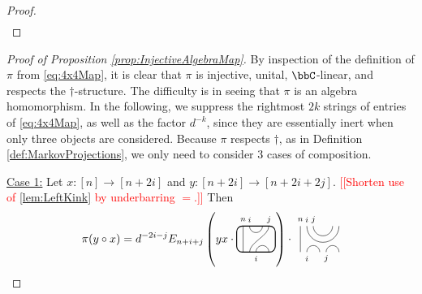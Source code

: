 \documentclass[11pt]{article}
\theoremstyle{plain}
\theoremstyle{definition}
\newcommand{\nn}[1]{\textcolor{red}{[[#1]]}}
\newcommand{\TLPlusPIso}[3]{
 \TLTStart
 \TLTThrough{#1}
 \TLTSnakeR{#2}{#3}
 \TLTEnd
}
\newcommand{\TLCapJoin}[5]{
 \TLTStart
 \TLTThrough{#1}
 \TLTCapJoin{#2}{#3}{#4}{#5}
 \TLTEnd
}
\newcommand{\TLTCalcLabelOffset}[3][0cm]{
 \settowidth{#2}{\scriptsize{$#3$}}
 \setlength{#2}{.5#2}
 \setlength{#2}{\maxof{#2}{#1}}
}
\newcommand{\TLTEnd}{
 \draw[thick, rounded corners = 5pt] (0,0) rectangle ($ (TLTlead) + (0,.8) $);
 \end{tikzpicture}
}
\newcommand{\TLTStart}{
 \begin{tikzpicture}[baseline=.3cm]
 \coordinate (TLTlead) at (.2,0); %
 \let\TLTlabelwidth\relax
 \newlength{\TLTlabelwidth}
}
\newcommand{\TLTThrough}[1]{
 \TLTCalcLabelOffset[.2cm]{\TLTlabelwidth}{#1}
 \coordinate (TLTlead) at ($ (TLTlead) + ({\TLTlabelwidth},0) $);
 \begin{scope}[shift=(TLTlead)]
  \draw (0,0) -- (0,.8);
  \node at (0,1) {\scriptsize{$#1$}};
 \end{scope}
  \coordinate (TLTlead) at ($ (TLTlead) + ({\TLTlabelwidth},0) $);
}
\newcommand{\TLTSnakeR}[2]{
 \let\TLTscwidth\relax
 \newlength{\TLTscwidth}
 \let\TLTsswidth\relax
 \newlength{\TLTsswidth}
 \TLTCalcLabelOffset[.2cm]{\TLTscwidth}{#1}
 \TLTCalcLabelOffset[.5cm]{\TLTsswidth}{#2}
 \setlength{\TLTlabelwidth}{\TLTscwidth+\TLTsswidth}
 \setlength{\TLTlabelwidth}{\maxof{\TLTlabelwidth}{.7cm}} %
 \coordinate (TLTlead) at ($ (TLTlead) + ({\TLTscwidth},0) $);
 \begin{scope}[shift=(TLTlead)]
  \draw (.1,.8) arc (-180:0:.2cm);
  \draw (.1,0) .. controls ++(90:.3cm) and ++(270:.3cm) .. ($ (.1,.8) + ({\TLTlabelwidth},0) $);
  \draw ($ (.1,0) + ({\TLTsswidth},0) $) arc (180:0:.2cm);
  \node at (.1,1) {\scriptsize{$#1$}};
  \node at ($ (.1,1) + ({\TLTlabelwidth},0) $) {\scriptsize{$#2$}};
  \node at ($ (.1,-.2) + ({\TLTsswidth},0) $) {\scriptsize{$#1$}};
 \end{scope}
 \coordinate (TLTlead) at ($ (TLTlead) + ({\TLTlabelwidth+\TLTsswidth},0) $);
}
\newcommand{\TLTCapJoin}[4]{
 \let\TLTjoinlwidth\relax
 \newlength{\TLTjoinlwidth}
 \let\TLTjoinrwidth\relax
 \newlength{\TLTjoinrwidth}
 \let\TLTsplitlwidth\relax
 \newlength{\TLTsplitlwidth}
 \let\TLTsplitrwidth\relax
 \newlength{\TLTsplitrwidth}
 \TLTCalcLabelOffset[.8cm]{\TLTjoinrwidth}{#4} %
 \TLTCalcLabelOffset[.15cm]{\TLTjoinlwidth}{#3} %
 \TLTCalcLabelOffset[.6cm]{\TLTsplitlwidth}{#1}
 \TLTCalcLabelOffset[.6cm]{\TLTsplitrwidth}{#2}
 \setlength{\TLTlabelwidth}{\maxof{\TLTjoinlwidth}{\TLTsplitlwidth}}
 \coordinate (TLTlead) at ($ (TLTlead) + ({\TLTlabelwidth},0) $);
 \setlength{\TLTlabelwidth}{\maxof{\TLTjoinrwidth}{\TLTsplitrwidth}} %
 \begin{scope}[shift=(TLTlead)]
  \draw (0,.8) arc (-180:0:.5);
  \draw (0.2,.8) arc (-180:0:.3);
  \draw (0,0) arc (180:0:.2);
  \draw ({\TLTsplitlwidth},0) arc (180:0:.2);
  \node at (0,1) {\scriptsize{$#4$}};
  \node at ({\TLTjoinlwidth},1) {\scriptsize{$#3$}};
  \node at (0,-.2) {\scriptsize{$#1$}};
  \node at ({\TLTsplitlwidth},-.2) {\scriptsize{$#2$}};
 \end{scope}
 \coordinate (TLTlead) at ($ (TLTlead) + ({\TLTlabelwidth},0) $);
}
\begin{document}
\begin{proof}
\begin{align*}
\end{align*}
\end{proof}

\begin{proof}[Proof of Proposition \ref{prop:InjectiveAlgebraMap}]
By inspection of the definition of $\pi$ from \eqref{eq:4x4Map}, it is clear that $\pi$ is injective, unital, $\bbC$-linear, and respects the $\dag$-structure. 
The difficulty is in seeing that $\pi$ is an algebra homomorphism. 
In the following, we suppress the rightmost $2k$ strings of entries of \eqref{eq:4x4Map}, as well as the factor $d^{-k}$, since they are essentially inert when only three objects are considered. 
Because $\pi$ respects $\dag$, as in Definition \ref{def:MarkovProjections}, we only need to consider 3 cases of composition.
\item[\underline{Case 1:}]
Let $x:[n]\rightarrow [n+2i]$ and $y:[n+2i]\rightarrow [n+2i+2j]$. 
 \nn{Shorten use of \ref{lem:LeftKink} by underbarring $=$.}
Then 
$$
\pi(y\circ x)
=
d^{-2i-j}E_{n+i+j}
\left(yx \cdot 
 \begin{tikzpicture}[baseline=.3cm]
  \draw (.2,0) -- (.2,.8);
  \node at (.2,1) {\scriptsize{$n$}};
  \draw (.4,.8) arc (-180:0:.2cm);
  \node at (.4,1) {\scriptsize{$i$}};
  \draw (.4,0) .. controls ++(90:.3cm) and ++(270:.3cm) .. (1,.8);
  \node at (1,1) {\scriptsize{$j$}};
  \draw (.6,0) arc (180:0:.2cm);
  \node at (.6,-.2) {\scriptsize{$i$}};
  \draw[thick, rounded corners = 5pt] (0,0) rectangle (1.2,.8);
 \end{tikzpicture}
 \right) 
\cdot 
 \begin{tikzpicture}[baseline=.3cm]
  \draw (.2,0) -- (.2,.8);
  \node at (.2,1) {\scriptsize{$n$}};
  \draw (.4,0) arc (180:0:.2cm);
  \node at (.4,-.2) {\scriptsize{$i$}};
  \draw (1,0) arc (180:0:.2cm);
  \node at (1,-.2) {\scriptsize{$j$}};
  \draw (.4,.8) arc (-180:0:.5cm);
  \node at (.4,1) {\scriptsize{$i$}};
  \draw (.6,.8) arc (-180:0:.3cm);
  \node at (.6,1) {\scriptsize{$j$}};

\end{tikzpicture}$$
\end{proof}
\end{document}
